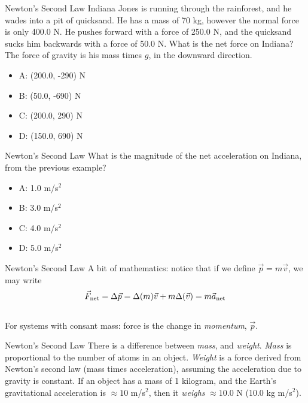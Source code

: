 \documentclass{beamer}
\begin{document}
\begin{frame}{Newton's Second Law}
Indiana Jones is running through the rainforest, and he wades into a pit of quicksand.  He has a mass of 70 kg, however the normal force is only 400.0 N.  He pushes forward with a force of 250.0 N, and the quicksand sucks him backwards with a force of 50.0 N.  What is the net force on Indiana?  The force of gravity is his mass times $g$, in the downward direction.
\begin{itemize}
\item A: (200.0, -290) N
\item B: (50.0, -690) N
\item C: (200.0, 290) N
\item D: (150.0, 690) N
\end{itemize}
\end{frame}

\begin{frame}{Newton's Second Law}
What is the magnitude of the net acceleration on Indiana, from the previous example?
\begin{itemize}
\item A: 1.0 m/s$^2$
\item B: 3.0 m/s$^2$
\item C: 4.0 m/s$^2$
\item D: 5.0 m/s$^2$
\end{itemize}
\end{frame}

\begin{frame}{Newton's Second Law}
A bit of mathematics: \alert{notice that if we define $\vec{p} = m\vec{v}$}, we may write \\
\vspace{0.5cm}
\begin{equation}
\vec{F}_{\rm net} = \Delta\vec{p} = \Delta(m)\vec{v} + m\Delta(\vec{v}) = m \vec{a}_{\rm net}
\end{equation} \\
\vspace{0.5cm}
For systems with consant mass: force is the change in \textit{momentum}, $\vec{p}$.
\end{frame}

\begin{frame}{Newton's Second Law}
There is a difference between \alert{\textit{mass}}, and \alert{\textit{weight}}.  \textit{Mass} is proportional to the number of atoms in an object.  \textit{Weight} is a force derived from Newton's second law (mass times acceleration), assuming the acceleration due to gravity is constant.  If an object has a mass of 1 kilogram, and the Earth's gravitational acceleration is $\approx 10$ m/s$^2$, then it \textit{weighs} $\approx 10.0$ N (10.0 kg m/s$^2$).
\end{frame}
\end{document}
